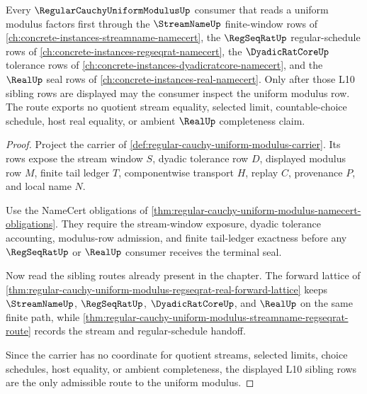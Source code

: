 \begin{theorem}
\label{thm:regular-cauchy-uniform-modulus-l10-sibling-route}
Every $\RegularCauchyUniformModulusUp$ consumer that reads a uniform modulus factors first through the $\StreamNameUp$ finite-window rows of \autoref{ch:concrete-instances-streamname-namecert}, the $\RegSeqRatUp$ regular-schedule rows of \autoref{ch:concrete-instances-regseqrat-namecert}, the $\DyadicRatCoreUp$ tolerance rows of \autoref{ch:concrete-instances-dyadicratcore-namecert}, and the $\RealUp$ seal rows of \autoref{ch:concrete-instances-real-namecert}. Only after those L10 sibling rows are displayed may the consumer inspect the uniform modulus row. The route exports no quotient stream equality, selected limit, countable-choice schedule, host real equality, or ambient $\RealUp$ completeness claim.
\end{theorem}
\begin{proof}
Project the carrier of \autoref{def:regular-cauchy-uniform-modulus-carrier}. Its rows expose the stream window $S$, dyadic tolerance row $D$, displayed modulus row $M$, finite tail ledger $T$, componentwise transport $H$, replay $C$, provenance $P$, and local name $N$.

Use the NameCert obligations of \autoref{thm:regular-cauchy-uniform-modulus-namecert-obligations}. They require the stream-window exposure, dyadic tolerance accounting, modulus-row admission, and finite tail-ledger exactness before any $\RegSeqRatUp$ or $\RealUp$ consumer receives the terminal seal.

Now read the sibling routes already present in the chapter. The forward lattice of \autoref{thm:regular-cauchy-uniform-modulus-regseqrat-real-forward-lattice} keeps $\StreamNameUp$, $\RegSeqRatUp$, $\DyadicRatCoreUp$, and $\RealUp$ on the same finite path, while \autoref{thm:regular-cauchy-uniform-modulus-streamname-regseqrat-route} records the stream and regular-schedule handoff.

Since the carrier has no coordinate for quotient streams, selected limits, choice schedules, host equality, or ambient completeness, the displayed L10 sibling rows are the only admissible route to the uniform modulus.
\end{proof}
